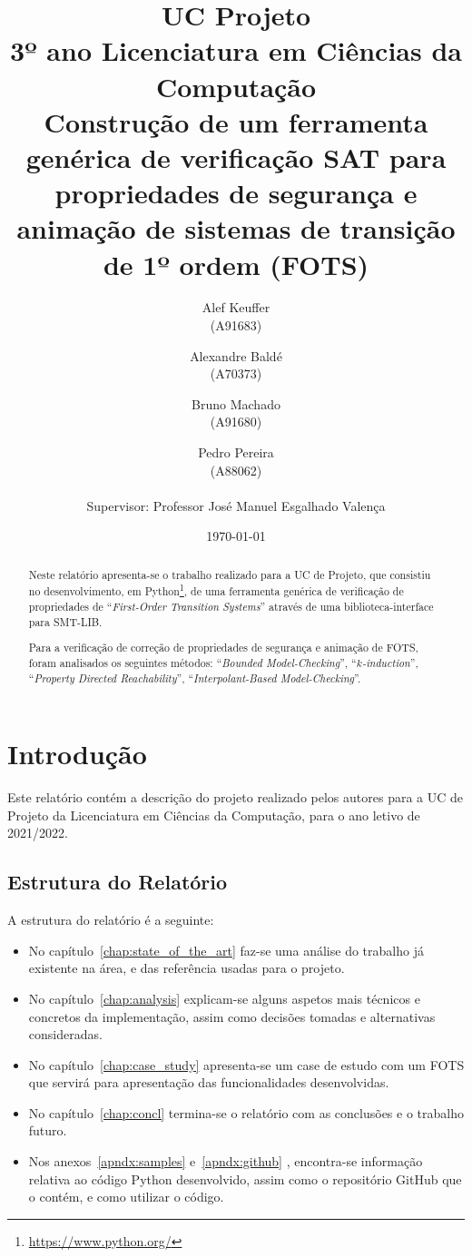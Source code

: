 \documentclass[11pt,a4paper]{report}%
\title{UC Projeto\\
      3º ano Licenciatura em Ciências da Computação \\
      Construção de um ferramenta genérica de verificação SAT para propriedades de segurança
e animação de sistemas de transição de 1º ordem (FOTS)
      } %
\author{Alef Keuffer\\ (A91683) \and Alexandre Baldé\\ (A70373)
         \and Bruno Machado\\ (A91680) \and Pedro Pereira\\ (A88062) \\ \\
        Supervisor: Professor José Manuel Esgalhado Valença
       } %
\date{\today} %
\def\pdr{``\textit{Property Directed Reachability}''\xspace}
\def\bmc{``\textit{Bounded Model-Checking}''\xspace}
\def\imc{``\textit{Interpolant-Based Model-Checking}''\xspace}
\def\fotss{``\textit{First-Order Transition Systems}''\xspace}
\def\kind{``\textit{$k$-induction}''\xspace}
\begin{document}
\maketitle %

\begin{abstract}  %
Neste relatório apresenta-se o trabalho realizado para a UC de Projeto, que
consistiu no desenvolvimento, em Python\footnote{\url{https://www.python.org/}}, de uma ferramenta genérica de verificação de
propriedades de \fotss através de uma biblioteca-interface para SMT-LIB.

Para a verificação de correção de propriedades de segurança e animação de FOTS,
foram analisados os seguintes métodos: \bmc, \kind, \pdr, \imc.
\end{abstract}

\tableofcontents %
\listoffigures %
\listoflistings

\chapter{Introdução} \label{chap:intro} %

Este relatório contém a descrição do projeto realizado pelos autores para a
UC de Projeto da Licenciatura em Ciências da Computação, para o ano letivo de 2021/2022.

\section{Estrutura do Relatório}

A estrutura do relatório é a seguinte:
\begin{itemize}
\item No capítulo~\ref{chap:state_of_the_art} faz-se uma análise do trabalho
  já existente na área, e das referência usadas para o projeto.

\item No capítulo~\ref{chap:analysis} explicam-se alguns aspetos mais técnicos e concretos
da implementação, assim como decisões tomadas e alternativas consideradas.

\item No capítulo~\ref{chap:case_study} apresenta-se um case de estudo com um FOTS que servirá para
apresentação das funcionalidades desenvolvidas.

\item No capítulo~\ref{chap:concl} termina-se o relatório com as conclusões e o trabalho futuro.

\item Nos anexos~\ref{apndx:samples} e~\ref{apndx:github} , encontra-se informação relativa ao código
Python desenvolvido, assim como o repositório GitHub que o contém, e como utilizar o código.

\end{itemize}
\end{document}
